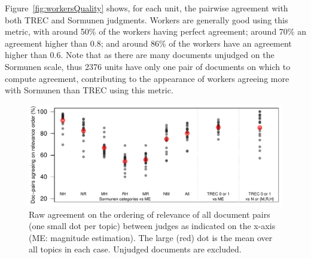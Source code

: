 Figure~\ref{fig:workersQuality} shows, for each unit, the pairwise
agreement with both TREC and Sormunen judgments. 
Workers are generally good using this metric, with 
around 50\% of the workers having perfect agreement; 
around 70\% an agreement higher than $0.8$; and 
around 86\% of the workers have an agreement higher than $0.6$.
Note that as there are many documents unjudged on the Sormunen
scale, thus 2376 units have only one pair of 
documents on which to compute agreement, contributing 
to the appearance 
of workers agreeing more with Sormunen than TREC using this metric.



\begin{figure}[tp]
  \centering
  \includegraphics[width=.7\linewidth]{figs/pairwise5.pdf}
  \vspace{-0.0cm}
  \caption{Raw agreement on the ordering of relevance of all document pairs (one
small dot per topic) between judges as indicated on the x-axis (ME: magnitude
estimation). The large (red) dot is the mean over all topics in each case. 
    Unjudged documents are excluded.
  \label{fig:agreement}
}
\end{figure}

% 


